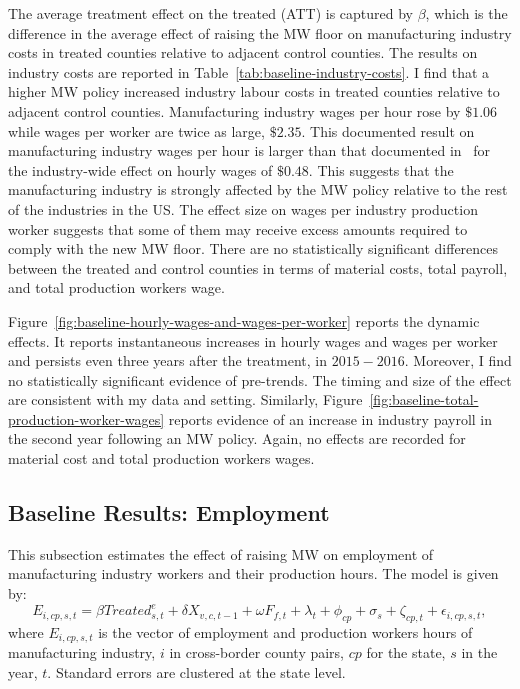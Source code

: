 \documentclass[12pt, english]{article}
\begin{document}
    The average treatment effect on the treated (ATT) is captured by $\beta$, which is the difference in the average effect of raising the MW floor on manufacturing industry costs in treated counties relative to adjacent control counties. The results on industry costs are reported in Table~\ref{tab:baseline-industry-costs}. I find that a higher MW policy increased industry labour costs in treated counties relative to adjacent control counties. Manufacturing industry wages per hour rose by $\$1.06$ while wages per worker are twice as large, $\$2.35$. This documented result on manufacturing industry wages per hour is larger than that documented in~\cite{gopalan2021state} for the industry-wide effect on hourly wages of $\$0.48$. This suggests that the manufacturing industry is strongly affected by the MW policy relative to the rest of the industries in the US. The effect size on wages per industry production worker suggests that some of them may receive excess amounts required to comply with the new MW floor. There are no statistically significant differences between the treated and control counties in terms of material costs, total payroll, and total production workers wage.
    

    Figure~\ref{fig:baseline-hourly-wages-and-wages-per-worker} reports the dynamic effects. It reports instantaneous increases in hourly wages and wages per worker and persists even three years after the treatment, in $2015-2016$. Moreover, I find no statistically significant evidence of pre-trends. The timing and size of the effect are consistent with my data and setting. Similarly, Figure~\ref{fig:baseline-total-production-worker-wages} reports evidence of an increase in industry payroll in the second year following an MW policy. Again, no effects are recorded for material cost and total production workers wages.
    

    \subsection{Baseline Results: Employment}\label{subsec:baseline-results-employment}
    This subsection estimates the effect of raising MW on employment of manufacturing industry workers and their production hours. The model is given by:
    \begin{equation}
        E_{i,cp,s,t} = \beta Treated_{s,t}^e + \delta X_{v,c,t-1} + \omega F_{f,t} + \lambda_{t} + \phi_{cp} + \sigma_{s} + \zeta_{cp,t} + \epsilon_{i,cp,s,t},\label{eq:baseline-emp-hours}
    \end{equation}
    where $E_{i,cp,s,t}$ is the vector of employment and production workers hours of manufacturing industry, $i$ in cross-border county pairs, $cp$ for the state, $s$ in the year, $t$. Standard errors are clustered at the state level.
    
\end{document}
